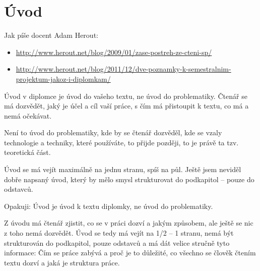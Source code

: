 \documentclass[12pt,oneside,final]{fithesis2}
\begin{document}
\FrontMatter
\ThesisTitlePage



\begin{ThesisDeclaration}
\DeclarationText
\AdvisorName
\end{ThesisDeclaration}












\tableofcontents



\MainMatter

\chapter{Úvod}
Jak píše docent Adam Herout:
\begin{itemize}
    \item \url{http://www.herout.net/blog/2009/01/zase-postreh-ze-cteni-sp/}
    \item \url{http://www.herout.net/blog/2011/12/dve-poznamky-k-semestralnim-projektum-jakoz-i-diplomkam/}
\end{itemize}

Úvod v diplomce je úvod do vašeho textu, ne úvod do problematiky. Čtenář se má dozvědět, jaký je účel a cíl vaší práce, s čím má přistoupit k textu, co má a nemá očekávat.

Není to úvod do problematiky, kde by se čtenář dozvěděl, kde se vzaly technologie a techniky, které používáte, to přijde později, to je právě ta tzv. teoretická část.

Úvod se má vejít maximálně na jednu stranu, spíš na půl. Ještě jsem neviděl dobře napsaný úvod, který by mělo smysl strukturovat do podkapitol – pouze do odstavců.

Opakuji: Úvod je úvod k textu diplomky, ne úvod do problematiky.

Z úvodu má čtenář zjistit, co se v práci dozví a jakým způsobem, ale ještě se nic z toho nemá dozvědět. Úvod se tedy má vejít na 1/2 – 1 stranu, nemá být strukturován do podkapitol, pouze odstavců a má dát velice stručně tyto informace: Čím se práce zabývá a proč je to důležité, co všechno se člověk čtením textu dozví a jaká je struktura práce.
\end{document}
